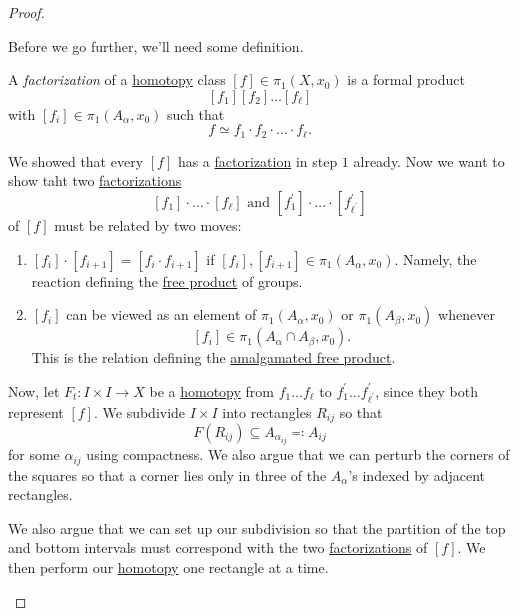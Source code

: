 \begin{proof}
\begin{enumerate}
		      Before we go further, we'll need some definition.
		      \begin{definition}[Factorization]\label{def:factorization}
			      A \emph{factorization} of a \hyperref[def:homotopy]{homotopy} class \([f]\in \pi _1(X, x_{0})\) is a formal product
			      \[
				      [f_1][f_2]\ldots [f_{\ell }]
			      \]
			      with \([f_{i}]\in \pi _1(A_\alpha , x_0)\) such that
			      \[
				      f\simeq f_1\cdot f_2\cdot\ldots \cdot f_{\ell}.
			      \]
		      \end{definition}
		      We showed that every \([f]\) has a \hyperref[def:factorization]{factorization} in step \(1\) already. Now we want to show taht
		      two \hyperref[def:factorization]{factorizations}
		      \[
			      [f_{1}]\cdot \ldots \cdot[f_{\ell }] \text{ and } [f_{1} ^\prime ]\cdot \ldots \cdot[f_{\ell ^\prime } ^\prime ]
		      \]
		      of \([f]\) must be related by two moves:
		      \begin{enumerate}
			      \item \([f_{i}]\cdot[f_{i+1}] = [f_{i}\cdot f_{i+1}]\) if \([f_{i}], [f_{i+1}]\in \pi _1(A_\alpha , x_0)\). Namely, the reaction
			            defining the \hyperref[def:free-product-with-amalgamation]{free product} of groups.
			      \item \([f_{i}]\) can be viewed as an element of \(\pi _1(A_\alpha , x_{0})\) or \(\pi _1(A_\beta , x_0)\) whenever
			            \[
				            [f_{i}]\in \pi _1(A_\alpha \cap A_\beta , x_{0}).
			            \]
			            This is the relation defining the \hyperref[def:free-product-with-amalgamation]{amalgamated free product}.
		      \end{enumerate}
		      Now, let \(F_{t}\colon I\times I\to X\) be a \hyperref[def:homotopy]{homotopy} from \(f_1 \ldots f_{\ell } \) to
		      \(f_1 ^\prime \ldots f ^\prime _{\ell ^\prime } \), since they both represent \([f]\). We subdivide \(I\times I\) into
		      rectangles \(R_{ij}\) so that
		      \[
			      F(R_{ij})\subseteq A_{\alpha _{ij}}\eqqcolon A_{ij}
		      \]
		      for some \(\alpha _{ij}\) using compactness. We also argue that we can perturb the corners of the squares so that a corner
		      lies only in three of the \(A_\alpha \)'s indexed by adjacent rectangles.
		      \begin{figure}[H]
			      \centering
			      \label{fig:pf:Seifert-Van-Kampen-thm-1}
		      \end{figure}
		      We also argue that we can set up our subdivision so that the partition of the top and bottom intervals must correspond with the
		      two \hyperref[def:factorization]{factorizations} of \([f]\). We then perform our \hyperref[def:homotopy]{homotopy} one
		      rectangle at a time.
		      \begin{figure}[H]
			      \centering
			      \label{fig:pf:Seifert-Van-Kampen-thm-2}
		      \end{figure}

\end{enumerate}
\end{proof}
